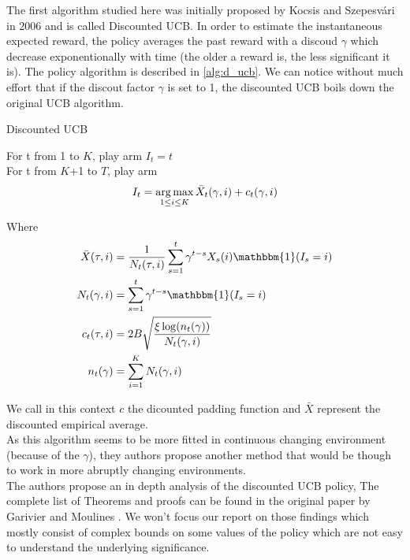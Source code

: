 The first algorithm studied here was initially proposed by Kocsis and Szepesvári in 2006 \cite{Kocsis06banditbased} and is called Discounted UCB. In order to estimate the instantaneous expected reward, the policy averages the past reward with a discoud $\gamma$ which decrease exponentionally with time (the older a reward is, the less significant it is).  The policy algorithm is described in \ref{alg:d_ucb}. We can notice without much effort that if the discout factor $\gamma$ is set to 1, the discounted UCB boils down the original UCB algorithm.\\

\begin{algorithm}[ht]
    \caption{Discounted UCB}
    \label{alg:d_ucb}
    For t from 1 to $K$, play arm $I_t = t$ \\
    For t from $K$+1 to $T$, play arm 
    $$ I_t = \operatorname*{arg\,max}_{1\leq i \leq K} \bar X_t(\gamma,i) + c_t(\gamma,i)$$
\end{algorithm}

Where
\begin{align}
\bar{X}(\tau, i) &= \frac{1}{N_t(\tau, i)}
\sum_{s=1}^t \gamma^{t-s}X_s(i)\mathbbm{1}(I_s=i)\\
N_t(\gamma, i) &= \sum_{s=1}^t \gamma^{t-s}\mathbbm{1}(I_s=i)\\
c_t(\tau, i) &= 2B\sqrt{\frac{\xi \log(n_t(\gamma))}{N_t(\gamma,i)}}\\
n_t(\gamma) &= \sum_{i=1}^K N_t(\gamma,i)
\end{align}

We call in this context $c$ the dicounted padding function and $\bar X$ represent the discounted empirical average.\\
As this algorithm seems to be more fitted in continuous changing environment (because of the $\gamma$), they authors propose another method that would be though to work in more abruptly changing environments.\\

The authors propose an in depth analysis of the discounted UCB policy,  The complete list of Theorems and proofs can be found in the original paper by Garivier and Moulines \cite{garivier2008upperconfidence}. We won't focus our report on those findings which mostly consist of complex bounds on some values of the policy which are not easy to understand the underlying significance.